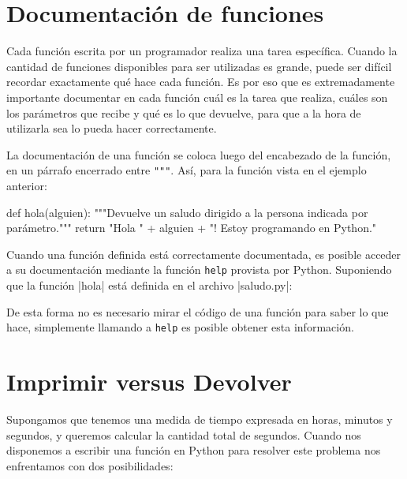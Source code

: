\section{Documentación de funciones}

Cada función escrita por un programador realiza una tarea específica.  Cuando
la cantidad de funciones disponibles para ser utilizadas es grande, puede ser
difícil recordar exactamente qué hace cada función.  Es por eso que es
extremadamente importante documentar en cada función cuál es la tarea que
realiza, cuáles son los parámetros que recibe y qué es lo que devuelve, para
que a la hora de utilizarla sea lo pueda hacer correctamente.

La documentación de una función se coloca luego del encabezado de la función,
en un párrafo encerrado entre \lstinline!"""!.  Así, para la función vista en
el ejemplo anterior:

\begin{codigo-python-sn}
def hola(alguien):
    """Devuelve un saludo dirigido a la persona indicada por parámetro."""
    return "Hola " + alguien + "! Estoy programando en Python."
\end{codigo-python-sn}

\begin{sabias_que}
Cuando una función definida está correctamente documentada, es posible acceder
a su documentación mediante la función \lstinline!help! provista por Python.
Suponiendo que la función |hola| está definida en el archivo |saludo.py|:


De esta forma no es necesario mirar el código de una función para saber lo que
hace, simplemente llamando a \lstinline!help! es posible obtener esta
información.
\end{sabias_que}

\section{Imprimir versus Devolver}

Supongamos que tenemos una medida de tiempo expresada en horas, minutos y
segundos, y queremos calcular la cantidad total de segundos. Cuando nos
disponemos a escribir una función en Python para resolver este problema nos
enfrentamos con dos posibilidades:

